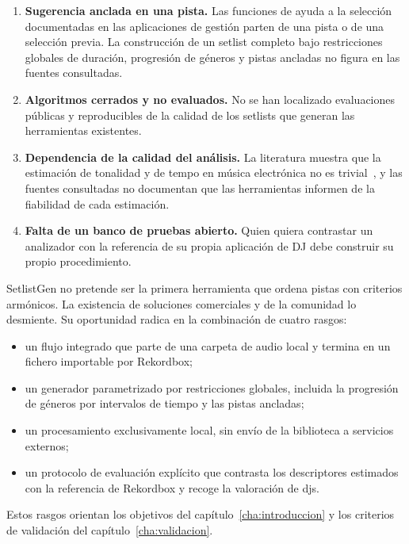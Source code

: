\begin{enumerate}[label=\textbf{L\arabic*.}, leftmargin=*]
  \item \textbf{Sugerencia anclada en una pista.} Las funciones de ayuda a la selección documentadas en las aplicaciones de gestión parten de una pista o de una selección previa. La construcción de un setlist completo bajo restricciones globales de duración, progresión de géneros y pistas ancladas no figura en las fuentes consultadas.
  \item \textbf{Algoritmos cerrados y no evaluados.} No se han localizado evaluaciones públicas y reproducibles de la calidad de los setlists que generan las herramientas existentes.
  \item \textbf{Dependencia de la calidad del análisis.} La literatura muestra que la estimación de tonalidad y de tempo en música electrónica no es trivial~\cite{faraldo2016key,gouyon2006experimental}, y las fuentes consultadas no documentan que las herramientas informen de la fiabilidad de cada estimación.
  \item \textbf{Falta de un banco de pruebas abierto.} Quien quiera contrastar un analizador con la referencia de su propia aplicación de DJ debe construir su propio procedimiento.
\end{enumerate}

SetlistGen no pretende ser la primera herramienta que ordena pistas con criterios armónicos. La existencia de soluciones comerciales y de la comunidad lo desmiente. Su oportunidad radica en la combinación de cuatro rasgos:
\begin{itemize}
  \item un flujo integrado que parte de una carpeta de audio local y termina en un fichero importable por Rekordbox;
  \item un generador parametrizado por restricciones globales, incluida la progresión de géneros por intervalos de tiempo y las pistas ancladas;
  \item un procesamiento exclusivamente local, sin envío de la biblioteca a servicios externos;
  \item un protocolo de evaluación explícito que contrasta los descriptores estimados con la referencia de Rekordbox y recoge la valoración de \acsp{dj}.
\end{itemize}

Estos rasgos orientan los objetivos del capítulo~\ref{cha:introduccion} y los criterios de validación del capítulo~\ref{cha:validacion}.









